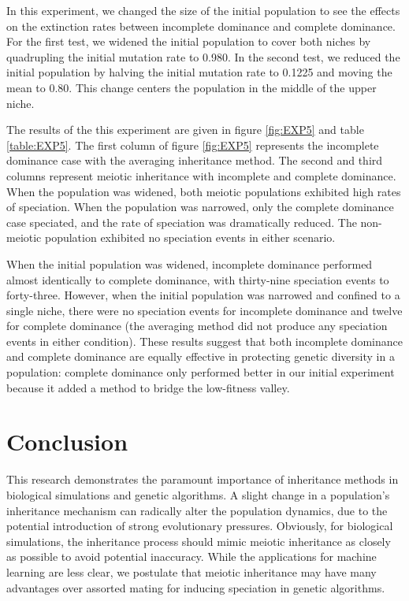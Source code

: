 \documentclass[conference]{IEEEtran}
\begin{document}
In this experiment, we changed the size of the initial population to see the effects on the extinction rates between incomplete dominance and complete dominance. For the first test, we widened the initial population to cover both niches by quadrupling the initial mutation rate to 0.980. In the second test, we reduced the initial population by halving the initial mutation rate to 0.1225 and moving the mean to 0.80. This change centers the population in the middle of the upper niche.

The results of the this experiment are given in figure \ref{fig:EXP5} and table \ref{table:EXP5}. The first column of figure \ref{fig:EXP5} represents the incomplete dominance case with the averaging inheritance method. The second and third columns represent meiotic inheritance with incomplete and complete dominance. When the population was widened, both meiotic populations exhibited high rates of speciation. When the population was narrowed, only the complete dominance case speciated, and the rate of speciation was dramatically reduced. The non-meiotic population exhibited no speciation events in either scenario. 

When the initial population was widened, incomplete dominance performed almost identically to complete dominance, with thirty-nine speciation events to forty-three. However, when the initial population was narrowed and confined to a single niche, there were no speciation events for incomplete dominance and twelve for complete dominance (the averaging method did not produce any speciation events in either condition). These results suggest that both incomplete dominance and complete dominance are equally effective in protecting genetic diversity in a population: complete dominance only performed better in our initial experiment because it added a method to bridge the low-fitness valley.



\section{Conclusion}

This research demonstrates the paramount importance of inheritance methods in biological simulations and genetic algorithms. A slight change in a population’s inheritance mechanism can radically alter the population dynamics, due to the potential introduction of strong evolutionary pressures. Obviously, for biological simulations, the inheritance process should mimic meiotic inheritance as closely as possible to avoid potential inaccuracy. While the applications for machine learning are less clear, we postulate that meiotic inheritance may have many advantages over assorted mating for inducing speciation in genetic algorithms.
\end{document}
